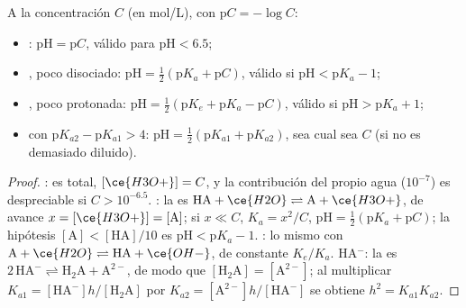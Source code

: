 \begin{proposition}\label{prop:b1:predominant-reaction:ph-formulas}
A la concentración $C$ (en \unit{mol/L}), con $\mathrm{p}C = -\log C$:
\begin{itemize}
  \item {}: $\mathrm{pH} = \mathrm{p}C$, válido para
        $\mathrm{pH} < 6.5$;
  \item {}, poco disociado: $\mathrm{pH} = \frac12(\mathrm{p}K_a
        + \mathrm{p}C)$, válido si $\mathrm{pH} < \mathrm{p}K_a - 1$;
  \item {}, poco protonada: $\mathrm{pH} = \frac12(\mathrm{p}K_e +
        \mathrm{p}K_a - \mathrm{p}C)$, válido si $\mathrm{pH} > \mathrm{p}K_a +
        1$;
  \item {} con $\mathrm{p}K_{a2} - \mathrm{p}K_{a1} > 4$:
        $\mathrm{pH} = \frac12(\mathrm{p}K_{a1} + \mathrm{p}K_{a2})$,
        sea cual sea $C$ (si no es demasiado diluido).
\end{itemize}
\end{proposition}

\begin{proof}
:  es total, $[\ce{H3O+}] = C$, y
la contribución del propio agua ($10^{-7}$) es despreciable si
$C > 10^{-6.5}$.
: la  es $\mathrm{HA} + \ce{H2O}
\rightleftharpoons \mathrm{A} + \ce{H3O+}$, de avance $x = [\ce{H3O+}]
= [\mathrm{A}]$; si $x \ll C$, $K_a = x^2/C$, $\mathrm{pH} = \frac12(\mathrm{p}K_a
+ \mathrm{p}C)$; la hipótesis $[\mathrm{A}] < [\mathrm{HA}]/10$ es
$\mathrm{pH} < \mathrm{p}K_a - 1$. : lo mismo con $\mathrm{A} +
\ce{H2O} \rightleftharpoons \mathrm{HA} + \ce{OH-}$, de constante
$K_e/K_a$.  HA$^-$: la  es
$2\,\mathrm{HA}^- \rightleftharpoons
\mathrm{H_2A} + \mathrm{A}^{2-}$, de modo que $[\mathrm{H_2A}] = [\mathrm{A}^{2-}]$;
al multiplicar $K_{a1} = [\mathrm{HA}^-]h/[\mathrm{H_2A}]$ por $K_{a2} =
[\mathrm{A}^{2-}]h/[\mathrm{HA}^-]$ se obtiene $h^2 = K_{a1}K_{a2}$.
\end{proof}

